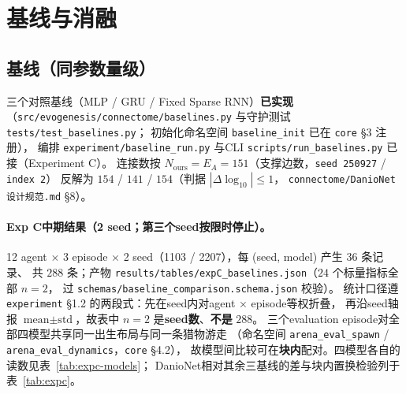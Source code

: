 \section{基线与消融}\label{sec:baselines}

{\footnotesize \subsection{基线（同参数量级）}
三个对照基线（MLP / GRU / Fixed Sparse RNN）\textbf{已实现}
（\texttt{src/evogenesis/connectome/baselines.py} 与守护测试 \texttt{tests/test\_baselines.py}；
初始化命名空间 \texttt{baseline\_init} 已在 \texttt{core} \S{}3 注册），
编排 \texttt{experiment/baseline\_run.py} 与CLI \texttt{scripts/run\_baselines.py} 已接（Experiment C）。
连接数按 $N_{\text{ours}} = E_A = 151$（支撑边数，\texttt{seed 250927} / \texttt{index 2}）
反解为 $154$ / $141$ / $154$（判据 $\left|\Delta\log_{10}\right|\le1$，
\texttt{connectome/DanioNet设计规范.md} \S8）。}

\paragraph{Exp C中期结果（2 seed；第三个seed按限时停止）。}
12 agent $\times$ 3 episode $\times$ 2 seed（1103 / 2207），每 (seed, model) 产生 $36$ 条记录、
共 $288$ 条；产物 \texttt{results/tables/expC\_baselines.json}（$24$ 个标量指标全部 $n=2$，
过 \texttt{schemas/baseline\_comparison.schema.json} 校验）。
统计口径遵 \texttt{experiment} \S1.2 的两段式：先在seed内对agent $\times$ episode等权折叠，
再沿seed轴报 $\text{mean}\pm\text{std}$，故表中 $n=2$ 是\textbf{seed数}、\textbf{不是} $288$。
三个evaluation episode对全部四模型共享同一出生布局与同一条猎物游走
（命名空间 \texttt{arena\_eval\_spawn} / \texttt{arena\_eval\_dynamics}，\texttt{core} \S4.2），
故模型间比较可在\textbf{块内}配对。四模型各自的读数见表~\ref{tab:expc-models}；
DanioNet相对其余三基线的差与块内置换检验列于表~\ref{tab:expc}。

